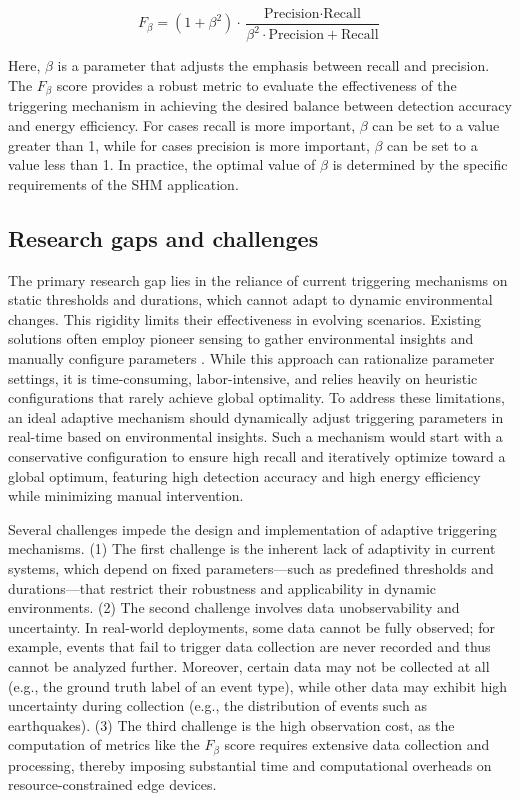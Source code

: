 \documentclass[a4paper,fleqn,numbers,sort&compress]{cas-sc}
\begin{document}
\begin{equation}
\label{eq:F-beta}
F_{\beta} = (1 + \beta^2) \cdot \frac{\text{Precision} \cdot \text{Recall}}{\beta^2 \cdot \text{Precision} + \text{Recall}}
\end{equation}

Here, \(\beta\) is a parameter that adjusts the emphasis between recall and precision. The $F_{\beta}$ score provides a robust metric to evaluate the effectiveness of the triggering mechanism in achieving the desired balance between detection accuracy and energy efficiency. For cases recall is more important, \(\beta\) can be set to a value greater than 1, while for cases precision is more important, \(\beta\) can be set to a value less than 1. In practice, the optimal value of \(\beta\) is determined by the specific requirements of the SHM application.

\subsection{Research gaps and challenges}
\label{sec:gaps_challenges}

The primary research gap lies in the reliance of current triggering mechanisms on static thresholds and durations, which cannot adapt to dynamic environmental changes. This rigidity limits their effectiveness in evolving scenarios. Existing solutions often employ pioneer sensing to gather environmental insights and manually configure parameters \citep{fu_suddenevent_2019}. While this approach can rationalize parameter settings, it is time-consuming, labor-intensive, and relies heavily on heuristic configurations that rarely achieve global optimality. To address these limitations, an ideal adaptive mechanism should dynamically adjust triggering parameters in real-time based on environmental insights. Such a mechanism would start with a conservative configuration to ensure high recall and iteratively optimize toward a global optimum, featuring high detection accuracy and high energy efficiency while minimizing manual intervention.

Several challenges impede the design and implementation of adaptive triggering mechanisms. (1) The first challenge is the inherent lack of adaptivity in current systems, which depend on fixed parameters—such as predefined thresholds and durations—that restrict their robustness and applicability in dynamic environments. (2) The second challenge involves data unobservability and uncertainty. In real-world deployments, some data cannot be fully observed; for example, events that fail to trigger data collection are never recorded and thus cannot be analyzed further. Moreover, certain data may not be collected at all (e.g., the ground truth label of an event type), while other data may exhibit high uncertainty during collection (e.g., the distribution of events such as earthquakes). (3) The third challenge is the high observation cost, as the computation of metrics like the \(F_{\beta}\) score requires extensive data collection and processing, thereby imposing substantial time and computational overheads on resource-constrained edge devices.
\end{document}
